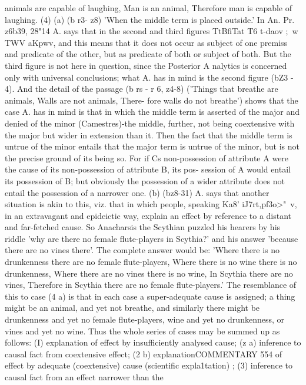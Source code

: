 {{{{{{{{{{{{{{animals are capable of laughing, Man is an animal, Therefore
man is capable of laughing.
(4) (a) (b r3- z8) 'When the middle term is placed outside.' In
An. Pr. z6b39, 28"14 A. says that in the second and third figures
TtBfiTat T6 t-daov ;~w TWV aKpwv, and this means that it does not
occur as subject of one premiss and predicate of the other, but
as predicate of both or subject of both. But the third figure is
not here in question, since the Posterior A nalytics is concerned
only with universal conclusions; what A. has in mind is the second
figure (bZ3 - 4). And the detail of the passage (b rs - r 6, z4-8)
('Things that breathe are animals, Walls are not animals, There-
fore walls do not breathe') shows that the case A. has in mind
is that in which the middle term is asserted of the major and
denied of the minor (Camestres)-the middle, further, not being
coextensive with the major but wider in extension than it. Then
the fact that the middle term is untrue of the minor entails
that the major term is untrue of the minor, but is not the precise
ground of its being so. For if Cs non-possession of attribute
A were the cause of its non-possession of attribute B, its pos-
session of A would entail its possession of B; but obviously the
possession of a wider attribute does not entail the possession of
a narrower one.
(b) (bz8-31) A. says that another situation is akin to this, viz.
that in which people, speaking Ka8' iJ7rt,pf3o>"~v, in an extravagant
and epideictic way, explain an effect by reference to a distant
and far-fetched cause. So Anacharsis the Scythian puzzled his
hearers by his riddle 'why are there no female flute-players in
Scythia?' and his answer 'because there are no vines there'. The
complete answer would be: 'Where there is no drunkenness there
are no female flute-players, Where there is no wine there is no
drunkenness, Where there are no vines there is no wine, In
Scythia there are no vines, Therefore in Scythia there are no
female flute-players.' The resemblance of this to case (4 a) is
that in each case a super-adequate cause is assigned; a thing
might be an animal, and yet not breathe, and similarly there
might be drunkenness and yet no female flute-players, wine and
yet no drunkenness, or vines and yet no wine.
Thus the whole series of cases may be summed up as follows:
(I) explanation of effect by insufficiently analysed cause; (z a)
inference to causal fact from coextensive effect; (2 b) explanationCOMMENTARY
554
of effect by adequate (coextensive) cause (scientific expla1tation) ;
(3) inference to causal fact from an effect narrower than the
}}}}}}}}}}}}}}
